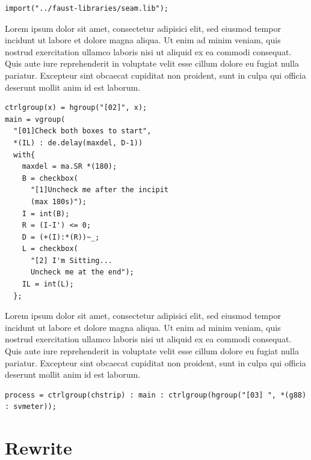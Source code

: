 \documentclass[twoside,a4paper]{article}
\begin{document}
\begin{lstlisting}
import("../faust-libraries/seam.lib");
\end{lstlisting}

Lorem ipsum dolor sit amet, consectetur adipisici elit, sed eiusmod tempor
incidunt ut labore et dolore magna aliqua. Ut enim ad minim veniam, quis
nostrud exercitation ullamco laboris nisi ut aliquid ex ea commodi consequat.
Quis aute iure reprehenderit in voluptate velit esse cillum dolore eu fugiat
nulla pariatur. Excepteur sint obcaecat cupiditat non proident, sunt in culpa
qui officia deserunt mollit anim id est laborum.

\begin{lstlisting}
ctrlgroup(x) = hgroup("[02]", x);
main = vgroup(
  "[01]Check both boxes to start",
  *(IL) : de.delay(maxdel, D-1))
  with{
    maxdel = ma.SR *(180);
    B = checkbox(
      "[1]Uncheck me after the incipit
      (max 180s)");
    I = int(B);
    R = (I-I') <= 0;
    D = (+(I):*(R))~_;
    L = checkbox(
      "[2] I'm Sitting...
      Uncheck me at the end");
    IL = int(L);
  };
\end{lstlisting}

Lorem ipsum dolor sit amet, consectetur adipisici elit, sed eiusmod tempor
incidunt ut labore et dolore magna aliqua. Ut enim ad minim veniam, quis
nostrud exercitation ullamco laboris nisi ut aliquid ex ea commodi consequat.
Quis aute iure reprehenderit in voluptate velit esse cillum dolore eu fugiat
nulla pariatur. Excepteur sint obcaecat cupiditat non proident, sunt in culpa
qui officia deserunt mollit anim id est laborum.


\begin{lstlisting}
process = ctrlgroup(chstrip) : main : ctrlgroup(hgroup("[03] ", *(g88) : svmeter));
\end{lstlisting}


\section{Rewrite}
\label{sec:rewriting}
\end{document}
